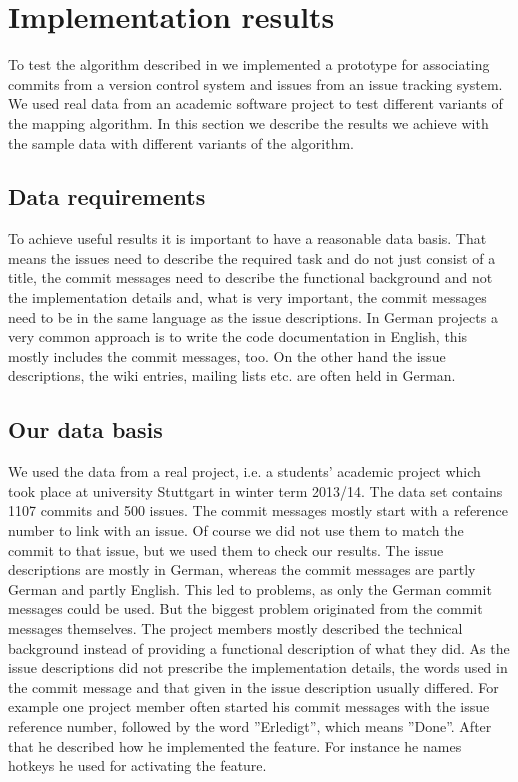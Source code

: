 \section{Implementation results}
\label{sec:implementation_results}
To test the algorithm described in  we implemented a prototype for associating commits from a version control system and issues from an issue tracking system.
We used real data from an academic software project to test different variants of the mapping algorithm.
In this section we describe the results we achieve with the sample data with different variants of the algorithm.

\subsection{Data requirements}
To achieve useful results it is important to have a reasonable data basis.
That means the issues need to describe the required task and do not just consist of a title, the commit messages need to describe the functional background and not the implementation details and, what is very important, the commit messages need to be in the same language as the issue descriptions.
In German projects a very common approach is to write the code documentation in English, this mostly includes the commit messages, too.
On the other hand the issue descriptions, the wiki entries, mailing lists etc. are often held in German.

\subsection{Our data basis}
We used the data from a real project, i.e. a students' academic project which took place at university Stuttgart in winter term 2013/14.
The data set contains 1107 commits and 500 issues.
The commit messages mostly start with a reference number to link with an issue.
Of course we did not use them to match the commit to that issue, but we used them to check our results.
The issue descriptions are mostly in German, whereas the commit messages are partly German and partly English.
This led to problems, as only the German commit messages could be used.
But the biggest problem originated from the commit messages themselves.
The project members mostly described the technical background instead of providing a functional description of what they did.
As the issue descriptions did not prescribe the implementation details, the words used in the commit message and that given in the issue description usually differed.
For example one project member often started his commit messages with the issue reference number, followed by the word ''Erledigt'', which means ''Done''.
After that he described how he implemented the feature.
For instance he names hotkeys he used for activating the feature.

